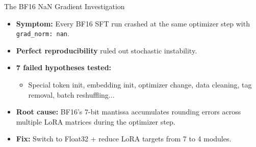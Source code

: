 \documentclass[10pt]{beamer}
\begin{document}
\begin{frame}{The BF16 NaN Gradient Investigation}
\large
\begin{itemize}
    \item<1-> \textbf{Symptom:} Every BF16 SFT run crashed at the same optimizer step with \texttt{grad\_norm: nan}.
    \vspace{0.2cm}

    \item<1-> \textbf{Perfect reproducibility} ruled out stochastic instability.
    \vspace{0.2cm}

    \item<2-> \textbf{7 failed hypotheses tested:}
    \begin{itemize}
        \item Special token init, embedding init, optimizer change, data cleaning, tag removal, batch reshuffling...
    \end{itemize}
    \vspace{0.2cm}

    \item<3-> \textbf{Root cause:} BF16's 7-bit mantissa accumulates rounding errors across multiple LoRA matrices during the optimizer step.
    \vspace{0.2cm}

    \item<3-> \textbf{Fix:} Switch to Float32 + reduce LoRA targets from 7 to 4 modules.
\end{itemize}
\end{frame}
\end{document}
